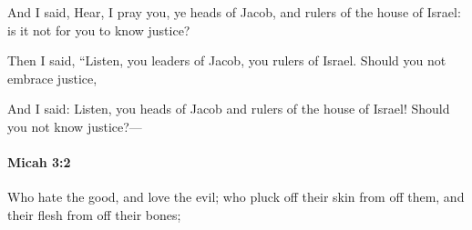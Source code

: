 			\begin{versebox}
					\item[BHS] 
					\item[LXX] 
					\item[ASV] And I said, Hear, I pray you, ye heads of Jacob, and rulers of the house of Israel: is it not for you to know justice?
					\item[NIV] Then I said, “Listen, you leaders of Jacob, you rulers of Israel. Should you not embrace justice,
					\item[NRSV] And I said: Listen, you heads of Jacob and rulers of the house of Israel! Should you not know justice?—
			\end{versebox}

		\paragraph{Micah 3:2} %
			\label{MICAH-3-2}

			Who hate the good, and love the evil; who pluck off their skin from off them, and their flesh from off their bones;

